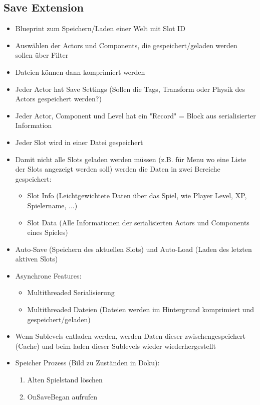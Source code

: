\subsection{Save Extension}

\begin{itemize}
    \item Blueprint zum Speichern/Laden einer Welt mit Slot ID
    \item Auswählen der Actors und Components, die gespeichert/geladen werden sollen über Filter
    \item Dateien können dann komprimiert werden
    \item Jeder Actor hat Save Settings (Sollen die Tags, Transform oder Physik des Actors gespeichert werden?)
    \item Jeder Actor, Component und Level hat ein "Record" = Block aus serialisierter Information
    \item Jeder Slot wird in einer Datei gespeichert 
    \item Damit nicht alle Slots geladen werden müssen (z.B. für Menu wo eine Liste der Slots angezeigt werden soll) werden die Daten in zwei Bereiche gespeichert:
    \begin{itemize}
        \item Slot Info (Leichtgewichtete Daten über das Spiel, wie Player Level, XP, Spielername, ...)
        \item Slot Data (Alle Informationen der serialisierten Actors und Components eines Spieles)
    \end{itemize}
    \item Auto-Save (Speichern des aktuellen Slots) und Auto-Load (Laden des letzten aktiven Slots)
    \item Asynchrone Features:
    \begin{itemize}
        \item Multithreaded Serialisierung
        \item Multithreaded Dateien (Dateien werden im Hintergrund komprimiert und gespeichert/geladen)
    \end{itemize} 
    \item Wenn Sublevels entladen werden, werden Daten dieser zwischengespeichert (Cache) und beim laden dieser Sublevels wieder wiederhergestellt
    \item Speicher Prozess (Bild zu Zuständen in Doku):
    \begin{enumerate}
        \item Alten Spielstand löschen
        \item OnSaveBegan aufrufen

\end{enumerate}
\end{itemize}
